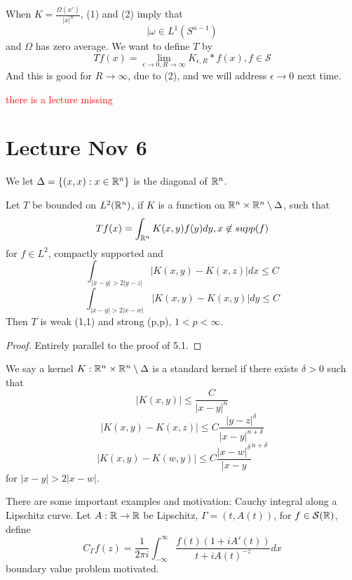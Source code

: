 \begin{remark}
    When $K=\frac{\Omega(x')}{|x|^n}$, (1) and (2) imply that
    \begin{equation*}
        |\omega\in L^1(S^{n-1})
    \end{equation*}
    and $\Omega$ has zero average. We want to define $T$ by
    \begin{equation*}
        Tf(x)=\lim_{\epsilon\to 0, R\to\infty} K_{\epsilon, R}\ast f(x), f\in\mathcal{S}
    \end{equation*}
    And this is good for $R\to\infty$, due to (2), and we will address $\epsilon\to 0$ next time.
\end{remark}


\textcolor{red}{there is a lecture  missing}

\section{Lecture Nov 6}
We let $\Delta=\{(x,x):x\in\mathbb{R}^n\}$ is the diagonal of $\mathbb{R}^n$.

\begin{theorem}
    Let $T$ be bounded on $L^2(\mathbb{R}^n)$, if $K$ is a function on $\mathbb{R}^n\times\mathbb{R}^n\setminus\Delta$, such that 
    \begin{equation*}
        Tf(x)=\int_{\mathbb{R}^n}K(x,y)f(y)dy, x\not\in supp(f)
    \end{equation*}
    for $f\in L^2$, compactly supported and 
    \begin{equation*}
        \int_{|x-y|>2|y-z|}|K(x,y)-K(x,z)|dx\leq C
    \end{equation*}
    \begin{equation*}
        \int_{|x-y|>2|x-w|}|K(x,y)-K(x,y)|dy\leq C
    \end{equation*}
    Then $T$ is weak (1,1) and strong (p,p), $1<p<\infty$.
\end{theorem}
\begin{proof}
    Entirely parallel to the proof of 5.1.
\end{proof}

\begin{definition}
    We say a kernel $K:\mathbb{R}^n\times\mathbb{R}^n\setminus\Delta$ is a standard kernel if there exists $\delta>0$ such that 
    \begin{equation*}
        |K(x,y)|\leq \frac{C}{|x-y|^n}
    \end{equation*}
    \begin{equation*}
        |K(x,y)-K(x,z)|\leq C\frac{|y-z|^\delta}{|x-y|^{n+\delta}}
    \end{equation*}
    \begin{equation*}
        |K(x,y)-K(w,y)|\leq C\frac{|x-w|^\delta}{|x-y}^{n+\delta}
    \end{equation*}
    for $|x-y|>2|x-w|$.
\end{definition}
There are some important examples and motivation: Cauchy integral along a Lipschitz curve. Let $A: \mathbb{R}\to\mathbb{R}$ be Lipschitz, $\Gamma=(t, A(t))$, for $f\in\mathcal{S}(\mathbb{R})$, define 
\begin{equation*}
    C_\Gamma f(z)=\frac{1}{2\pi i}\int_{-\infty}^\infty \frac{f(t)(1+iA'(t))}{t+iA(t)^{-z}}dx
\end{equation*}
boundary value problem motivated.

